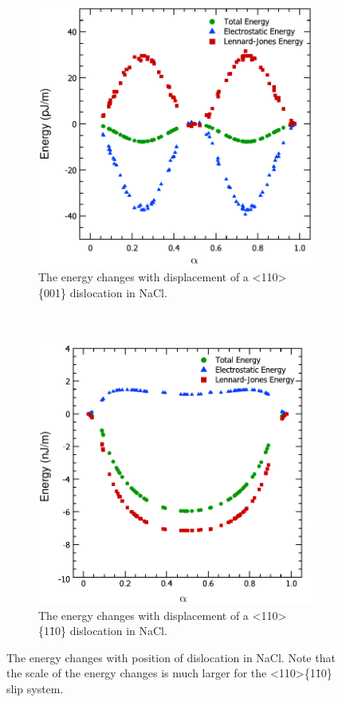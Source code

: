 \begin{figure}
\centering
\begin{subfigure}{0.4\textwidth}
\centering
\includegraphics[width=\textwidth]{NaCl_110_001_U_vs_alpha}
\caption{The energy changes with displacement of a <110>\{001\} dislocation in NaCl.\label{fig:NaCl_110_001_energy_changes}}
\end{subfigure}
~
\begin{subfigure}{0.4\textwidth}
\centering
\includegraphics[width=\textwidth]{NaCl_110_110_U_vs_alpha}
\caption{The energy changes with displacement of a <110>\{1\={1}0\} dislocation in NaCl.\label{fig:NaCl_110_110_energy_changes}}
\end{subfigure}
\caption[The energy changes with position of dislocation in NaCl.]{The energy changes with position of dislocation in NaCl. Note that the scale of the energy changes is much larger for the <110>\{1\={1}0\} slip system.\label{fig:NaCl_energy_changes}}


\end{figure}
